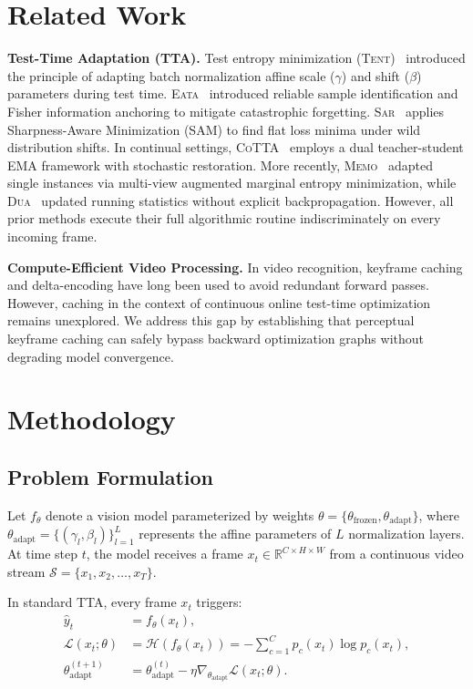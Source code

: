 \documentclass[10pt,twocolumn,letterpaper]{article}
\begin{document}
\section{Related Work}
\label{sec:related}
\textbf{Test-Time Adaptation (TTA).} Test entropy minimization (\textsc{Tent})~\cite{wang2021tent} introduced the principle of adapting batch normalization affine scale ($\gamma$) and shift ($\beta$) parameters during test time. \textsc{Eata}~\cite{niu2022eata} introduced reliable sample identification and Fisher information anchoring to mitigate catastrophic forgetting. \textsc{Sar}~\cite{niu2023sar} applies Sharpness-Aware Minimization (SAM) to find flat loss minima under wild distribution shifts. In continual settings, \textsc{CoTTA}~\cite{wang2022cotta} employs a dual teacher-student EMA framework with stochastic restoration. More recently, \textsc{Memo}~\cite{zhang2022memo} adapted single instances via multi-view augmented marginal entropy minimization, while \textsc{Dua}~\cite{mirza2022dua} updated running statistics without explicit backpropagation. However, all prior methods execute their full algorithmic routine indiscriminately on every incoming frame.

\textbf{Compute-Efficient Video Processing.} In video recognition, keyframe caching and delta-encoding have long been used to avoid redundant forward passes. However, caching in the context of continuous online test-time optimization remains unexplored. We address this gap by establishing that perceptual keyframe caching can safely bypass backward optimization graphs without degrading model convergence.

\section{Methodology}
\label{sec:method}

\subsection{Problem Formulation}
Let $f_\theta$ denote a vision model parameterized by weights $\theta = \{\theta_{\text{frozen}}, \theta_{\text{adapt}}\}$, where $\theta_{\text{adapt}} = \{(\gamma_l, \beta_l)\}_{l=1}^L$ represents the affine parameters of $L$ normalization layers. At time step $t$, the model receives a frame $x_t \in \mathbb{R}^{C \times H \times W}$ from a continuous video stream $\mathcal{S} = \{x_1, x_2, \dots, x_T\}$.

In standard TTA, every frame $x_t$ triggers:
\begin{align}
    \hat{y}_t &= f_\theta(x_t), \\
    \mathcal{L}(x_t; \theta) &= \mathcal{H}(f_\theta(x_t)) = -\sum_{c=1}^C p_c(x_t) \log p_c(x_t), \\
    \theta_{\text{adapt}}^{(t+1)} &= \theta_{\text{adapt}}^{(t)} - \eta \nabla_{\theta_{\text{adapt}}} \mathcal{L}(x_t; \theta).
\end{align}
\end{document}
